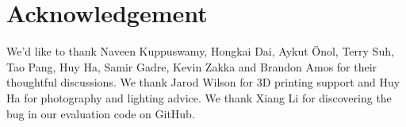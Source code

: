 \section{Acknowledgement}


We'd like to thank Naveen Kuppuswamy, Hongkai Dai, Aykut Önol, Terry Suh, Tao Pang, Huy Ha, Samir Gadre, Kevin Zakka and Brandon Amos for their thoughtful discussions. We thank Jarod Wilson for 3D printing support and Huy Ha for photography and lighting advice. We thank Xiang Li for discovering the bug in our evaluation code on GitHub.


